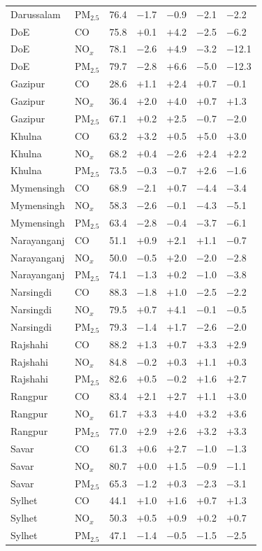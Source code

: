 \begin{longtable}{L{3.2cm} L{1.2cm} C{1.6cm} C{1.6cm} C{1.6cm} C{1.6cm} C{1.6cm}}
Darussalam & PM$_{2.5}$ & 76.4 & $-$1.7 & $-$0.9 & $-$2.1 & $-$2.2 \\
DoE & CO & 75.8 & $+$0.1 & $+$4.2 & $-$2.5 & $-$6.2 \\
DoE & NO$_x$ & 78.1 & $-$2.6 & $+$4.9 & $-$3.2 & $-$12.1 \\
DoE & PM$_{2.5}$ & 79.7 & $-$2.8 & $+$6.6 & $-$5.0 & $-$12.3 \\
Gazipur & CO & 28.6 & $+$1.1 & $+$2.4 & $+$0.7 & $-$0.1 \\
Gazipur & NO$_x$ & 36.4 & $+$2.0 & $+$4.0 & $+$0.7 & $+$1.3 \\
Gazipur & PM$_{2.5}$ & 67.1 & $+$0.2 & $+$2.5 & $-$0.7 & $-$2.0 \\
Khulna & CO & 63.2 & $+$3.2 & $+$0.5 & $+$5.0 & $+$3.0 \\
Khulna & NO$_x$ & 68.2 & $+$0.4 & $-$2.6 & $+$2.4 & $+$2.2 \\
Khulna & PM$_{2.5}$ & 73.5 & $-$0.3 & $-$0.7 & $+$2.6 & $-$1.6 \\
Mymensingh & CO & 68.9 & $-$2.1 & $+$0.7 & $-$4.4 & $-$3.4 \\
Mymensingh & NO$_x$ & 58.3 & $-$2.6 & $-$0.1 & $-$4.3 & $-$5.1 \\
Mymensingh & PM$_{2.5}$ & 63.4 & $-$2.8 & $-$0.4 & $-$3.7 & $-$6.1 \\
Narayanganj & CO & 51.1 & $+$0.9 & $+$2.1 & $+$1.1 & $-$0.7 \\
Narayanganj & NO$_x$ & 50.0 & $-$0.5 & $+$2.0 & $-$2.0 & $-$2.8 \\
Narayanganj & PM$_{2.5}$ & 74.1 & $-$1.3 & $+$0.2 & $-$1.0 & $-$3.8 \\
Narsingdi & CO & 88.3 & $-$1.8 & $+$1.0 & $-$2.5 & $-$2.2 \\
Narsingdi & NO$_x$ & 79.5 & $+$0.7 & $+$4.1 & $-$0.1 & $-$0.5 \\
Narsingdi & PM$_{2.5}$ & 79.3 & $-$1.4 & $+$1.7 & $-$2.6 & $-$2.0 \\
Rajshahi & CO & 88.2 & $+$1.3 & $+$0.7 & $+$3.3 & $+$2.9 \\
Rajshahi & NO$_x$ & 84.8 & $-$0.2 & $+$0.3 & $+$1.1 & $+$0.3 \\
Rajshahi & PM$_{2.5}$ & 82.6 & $+$0.5 & $-$0.2 & $+$1.6 & $+$2.7 \\
Rangpur & CO & 83.4 & $+$2.1 & $+$2.7 & $+$1.1 & $+$3.0 \\
Rangpur & NO$_x$ & 61.7 & $+$3.3 & $+$4.0 & $+$3.2 & $+$3.6 \\
Rangpur & PM$_{2.5}$ & 77.0 & $+$2.9 & $+$2.6 & $+$3.2 & $+$3.3 \\
Savar & CO & 61.3 & $+$0.6 & $+$2.7 & $-$1.0 & $-$1.3 \\
Savar & NO$_x$ & 80.7 & $+$0.0 & $+$1.5 & $-$0.9 & $-$1.1 \\
Savar & PM$_{2.5}$ & 65.3 & $-$1.2 & $+$0.3 & $-$2.3 & $-$3.1 \\
Sylhet & CO & 44.1 & $+$1.0 & $+$1.6 & $+$0.7 & $+$1.3 \\
Sylhet & NO$_x$ & 50.3 & $+$0.5 & $+$0.9 & $+$0.2 & $+$0.7 \\
Sylhet & PM$_{2.5}$ & 47.1 & $-$1.4 & $-$0.5 & $-$1.5 & $-$2.5 \\
\end{longtable}
\endgroup
